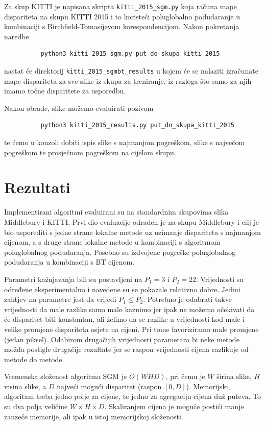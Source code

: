 \documentclass[utf8, zavrsni, numeric]{fer}
\begin{document}
Za skup KITTI je napisana skripta {\verb|kitti_2015_sgm.py|} koja računa mape dispariteta
na skupu KITTI 2015 i to koristeći poluglobalno podudaranje u kombinaciji s Birchfield-Tomasijevom korespondencijom. Nakon pokretanja naredbe
\begin{verbatim}
          python3 kitti_2015_sgm.py put_do_skupa_kitti_2015
\end{verbatim}
nastat će direktorij {\verb|kitti_2015_sgmbt_results|} u kojem će se nalaziti izračunate
mape dispariteta za sve slike iz skupa za treniranje, iz razloga što samo za njih imamo točne
disparitete za usporedbu.

Nakon obrade, slike možemo evaluirati pozivom
\begin{verbatim}
          python3 kitti_2015_results.py put_do_skupa_kitti_2015
\end{verbatim}
te ćemo u konzoli dobiti ispis slike s najmanjom pogreškom, slike s najvećom pogreškom te
prosječnom pogreškom na cijelom skupu.



\chapter{Rezultati}

Implementirani algoritmi evaluirani su na standardnim skupovima slika Middlebury i KITTI.
Prvi dio evaluacije odrađen je na skupu Middlebury i cilj je bio usporediti s jedne strane lokalne metode
uz uzimanje dispariteta s najmanjom cijenom, a s druge strane lokalne metode u kombinaciji s
algoritmom poluglobalnog podudaranja. Posebno su izdvojene pogreške poluglobalnog podudaranja
u kombinaciji s BT cijenom.

Parametri kažnjavanja bili su postavljeni na $P_1 = 3$ i $P_2 = 22$. Vrijednosti su određene eksperimentalno i navedene su se pokazale relativno dobre. Jedini zahtjev na parametre jest da vrijedi $P_1 \leq P_2$.
Potrebno je odabrati takve vrijednosti da male razlike samo malo kaznimo jer ipak ne možemo očekivati da će disparitet biti konstantan, ali želimo da se razlike u vrijednosti kod male i velike promjene dispariteta osjete na cijeni.
Pri tome favoriziramo male promjene (jedan piksel). Odabirom drugačijih vrijednosti parametara bi neke metode možda postigle drugačije rezultate jer se raspon vrijednosti cijena razlikuje od metode do metode.

Vremenska složenost algoritma SGM je $O(WHD)$, pri čemu je $W$ širina slike, $H$ visina slike, a $D$ najveći mogući disparitet (raspon $[0, D]$). Memorijski, algoritam treba jedno polje za cijene, te jedno za agregaciju cijena duž puteva. To su dva polja veličine $W \times H \times D$. Skaliranjem cijena je moguće postići manje zauzeće memorije, ali ipak u istoj memorijskoj složenosti.
\end{document}
